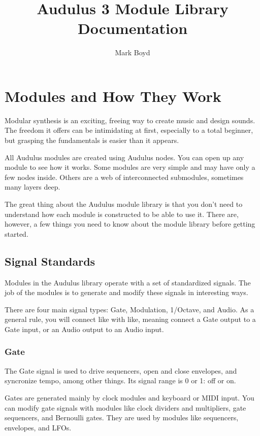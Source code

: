 \documentclass[11pt]{book}
\title{Audulus 3 Module Library Documentation}
\author{Mark Boyd}
\begin{document}
\maketitle

\tableofcontents
\chapter{Modules and How They Work}

Modular synthesis is an exciting, freeing way to create music and design sounds. The freedom it offers can be intimidating at first, especially to a total beginner, but grasping the fundamentals is easier than it appears.

All Audulus modules are created using Audulus nodes. You can open up any module to see how it works. Some modules are very simple and may have only a few nodes inside. Others are a web of interconnected submodules, sometimes many layers deep.

The great thing about the Audulus module library is that you don't need to understand how each module is constructed to be able to use it. There are, however, a few things you need to know about the module library before getting started.

\section{Signal Standards}

Modules in the Audulus library operate with a set of standardized signals. The job of the modules is to generate and modify these signals in interesting ways.

There are four main signal types: Gate, Modulation, 1/Octave, and Audio. As a general rule, you will connect like with like, meaning connect a Gate output to a Gate input, or an Audio output to an Audio input.

\subsection{Gate}

The Gate signal is used to drive sequencers, open and close envelopes, and syncronize tempo, among other things. Its signal range is 0 or 1: off or on.

Gates are generated mainly by clock modules and keyboard or MIDI input. You can modify gate signals with modules like clock dividers and multipliers, gate sequencers, and Bernoulli gates. They are used by modules like sequencers, envelopes, and LFOs.
\end{document}
